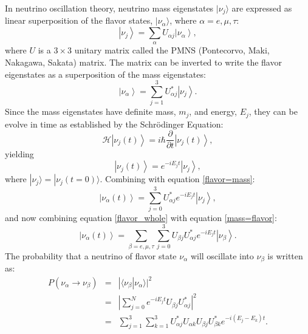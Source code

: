 \documentclass[aps,prd,twocolumn,nofootinbib]{revtex4-1}
\begin{document}
In neutrino oscillation theory, neutrino mass eigenstates $|\nu_j\rangle$ are expressed as linear superposition of the flavor states, $|\nu_{\alpha}\rangle$, where $\alpha = e,\mu,\tau$:
\begin{equation}
  \left|\nu_j\right\rangle = \sum_{\alpha}U_{\alpha j}\left|\nu_{\alpha}\right\rangle,
  \label{mass=flavor}
\end{equation}
where $U$ is a $3\times3$ unitary matrix called the PMNS (Pontecorvo, Maki, Nakagawa, Sakata) matrix. The matrix can be inverted to write the flavor eigenstates as a superposition of the mass eigenstates:
\begin{equation}
  \left|\nu_{\alpha}\right\rangle = \sum_{j=1}^3U^*_{\alpha j}\left|\nu_{j}\right\rangle.
  \label{flavor=mass}
\end{equation}
Since the mass eigenstates have definite mass, $m_j$, and energy, $E_j$, they can be evolve in time as established by the Schr\"odinger Equation:
\begin{equation}
  \mathcal{H}\left|\nu_j(t)\right\rangle = i\hbar \frac{\partial}{\partial t}\left|\nu_j(t)\right\rangle,
  \label{nu-schro1}
\end{equation}
yielding
\begin{equation}
  \left|\nu_j(t)\right\rangle = e^{-iE_jt}\left|\nu_j\right\rangle,
  \label{nu-schro2}
\end{equation}
where $|\nu_j\rangle = |\nu_j(t=0)\rangle$. Combining with equation \ref{flavor=mass}:
\begin{equation}
  \left|\nu_{\alpha}(t)\right\rangle = \sum_{j=0}^3 U_{\alpha j}^* e^{-iE_jt}\left|\nu_j\right\rangle,
  \label{flavor_whole}
\end{equation}
and now combining equation \ref{flavor_whole} with equation \ref{mass=flavor}:
\begin{equation}
  \left|\nu_{\alpha}(t)\right\rangle = \sum_{\beta=e,\mu,\tau}\sum_{j=0}^3U_{\beta j}U_{\alpha j}^* e^{-iE_jt}\left|\nu_{\beta}\right\rangle.
\end{equation}
The probability that a neutrino of flavor state $\nu_{\alpha}$ will oscillate into $\nu_{\beta}$ is written as:
\begin{eqnarray}
  P(\nu_{\alpha}\rightarrow\nu_{\beta}) &=& |\langle\nu_{\beta}|\nu_{\alpha}\rangle|^2 \nonumber \\
                                        &=& \left|\sum_{j=0}^Ne^{-iE_jt}U_{\beta j}U_{\alpha j}^*\right|^2 \nonumber \\
                                        &=& \sum_{j=1}^3\sum_{k=1}^3U_{\alpha j}^*U_{\alpha k}U_{\beta j}U_{\beta k}^*e^{-i(E_j-E_k)t}.
\end{eqnarray}
\end{document}
